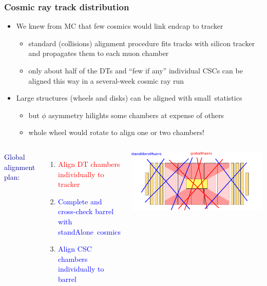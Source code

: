 \documentclass[compress]{beamer}
\begin{document}
\begin{frame}
\frametitle{Cosmic ray track distribution}
\begin{itemize}
\item We knew from MC that few cosmics would link endcap to tracker
\begin{itemize}
\item standard (collisions) alignment procedure fits tracks with silicon tracker
  and propagates them to each muon chamber
\item only about half of the DTs and ``few if any'' individual CSCs can be
  aligned this way in a several-week cosmic ray run
\end{itemize}

\item Large structures (wheels and disks) can be aligned with \mbox{small statistics\hspace{-1 cm}}
\begin{itemize}
\item but $\phi$ asymmetry hilights some chambers at expense of others
\item whole wheel would rotate to align one or two chambers!
\end{itemize}
\end{itemize}

\begin{columns}
\textcolor{darkblue}{\large Global alignment plan:}

\begin{enumerate}
\item<alert@1> \textcolor{red}{Align DT chambers individually to tracker}
\item \textcolor{blue}{Complete and cross-check barrel with \mbox{standAlone cosmics\hspace{-1 cm}}}
\item \textcolor{blue}{Align CSC chambers individually to barrel}
\end{enumerate}

\includegraphics[width=\linewidth]{accessible_to_globalMuons.pdf}
\end{columns}
\end{frame}
\end{document}
